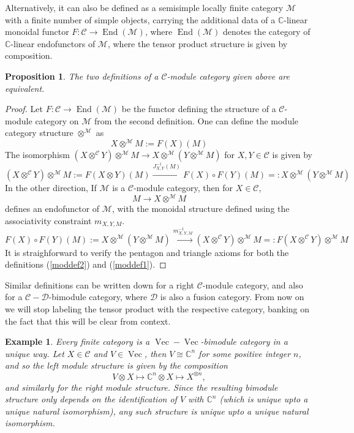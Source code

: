 \documentclass[11pt]{book}
\newtheorem{Prop}[theorem]{Proposition}
\theoremstyle{Rem}
\newtheorem{Expl}[theorem]{Example}
\theoremstyle{definition}
\numberwithin{equation}{section}
\newcommand\End{\operatorname{End}}
\newcommand\inv{^{-1}}
\newcommand\Vect{\operatorname{Vec}}
\newcommand\kk{\mathbb C}
\newcommand\M{\mathcal{M}}
\newcommand\C{\mathcal C}
\newcommand\D{\mathcal D}
\begin{document}
Alternatively, it can also be defined as a semisimple locally finite category $\M$ with a finite number of simple objects, carrying the additional data of a $\kk$-linear monoidal functor $F:\C\rightarrow \End(\M)$, where $\End(\M)$ denotes the category of $\kk$-linear endofunctors of $\M$, where the tensor product structure is given by composition.
\begin{Prop}
The two definitions of a $\C$-module category given above are equivalent.
\end{Prop}
\begin{proof}
Let $F:\C\rightarrow \End(\M)$ be the functor defining the structure of a $\C$-module category on $\M$ from the second definition. One can define the module category structure $\otimes^{\M}$ as \begin{equation}
	X\otimes^{\M} M := F(X)(M)
\end{equation}
The isomorphism $(X\otimes^\C Y)\otimes^\M M\rightarrow X\otimes^\M (Y\otimes^\M M)$ for $X, Y \in \C$ is given by \begin{equation}\label{moddef2}
	(X\otimes^\C Y)\otimes^\M M := F(X\otimes Y)(M) \xrightarrow{J\inv_{X, Y}(M)} F(X)\circ F(Y)(M) =: X\otimes ^\M (Y\otimes^\M M )   
\end{equation}
In the other direction, If $\M$ is a $\C$-module category, then for $X\in \C$, \begin{equation}
	M\rightarrow X\otimes^\M M
\end{equation}
defines an endofunctor of $\M$, with the monoidal structure defined using the associativity constraint $m_{X, Y, M}$.
\begin{equation}\label{moddef1}
	F(X)\circ F(Y)(M):= X\otimes^\M (Y \otimes^\M M) \xrightarrow{m\inv_{X, Y, M}} (X\otimes^\C Y) \otimes^\M M=: F(X\otimes^\C Y) \otimes^\M M 
\end{equation} It is straighforward to verify the pentagon and triangle axioms for both the definitions (\ref{moddef2}) and (\ref{moddef1}).
\end{proof}
Similar definitions can be written down for a right $\C$-module category, and also for a $\C-\D$-bimodule category, where $\D$ is also a fusion category. From now on we will stop labeling the tensor product with the respective category, banking on the fact that this will be clear from context.	
\begin{Expl}\rm
Every finite category is a $\Vect-\Vect$-bimodule category in a unique way. Let $X\in \C$ and $V \in \Vect$, then $V\cong \kk^n$ for some positive integer $n$, and so the left module structure is given by the composition\begin{equation}
	V\otimes X \mapsto \kk^n \otimes X \mapsto X^{\otimes n},
\end{equation} and similarly for the right module structure. Since the resulting bimodule structure only depends on the identification of $V$ with $\kk^n$ (which is unique upto a unique natural isomorphism), any such structure is unique upto a unique natural isomorphism. 
\end{Expl}
\end{document}
